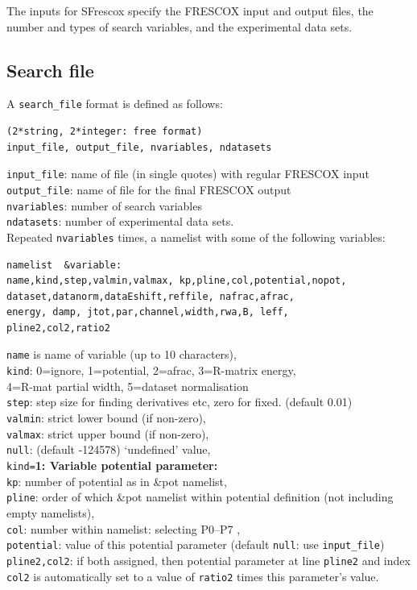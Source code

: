 \documentclass[11pt]{article}
\begin{document}
The inputs for {\sc SFrescox} specify the FRESCOX input and output files,
the number and types of search variables, and the experimental data sets.

\subsection{Search file}
A {\tt search\_file} format is defined as follows:
\begin{verbatim}
(2*string, 2*integer: free format)
input_file, output_file, nvariables, ndatasets
\end{verbatim}
\smallskip

{\tt input\_file}: name of file (in single quotes) with regular FRESCOX input\\
{\tt output\_file}: name of file for the final FRESCOX output\\
{\tt nvariables}: number of search variables\\
{\tt ndatasets}:  number of experimental data sets.\\

Repeated {\tt nvariables} times, a namelist with some of the following variables:
\begin{verbatim}
namelist  &variable:
name,kind,step,valmin,valmax, kp,pline,col,potential,nopot,
dataset,datanorm,dataEshift,reffile, nafrac,afrac,
energy, damp, jtot,par,channel,width,rwa,B, leff,
pline2,col2,ratio2
\end{verbatim}
{\tt name} is name of variable (up to 10 characters),\\
{\tt kind}: 0=ignore, 1=potential, 2=afrac, 3=R-matrix energy,\\
   \hspace*{10mm} 4=R-mat partial width, 5=dataset normalisation\\
{\tt step}: step size for finding derivatives etc, zero for fixed. (default 0.01)\\
{\tt valmin}: strict lower bound (if non-zero),\\
{\tt valmax}: strict upper bound (if non-zero), \\
{\tt null}: (default -124578) `undefined' value,\\

{\tt kind=}{\bf 1: Variable potential parameter:}\\
{\tt kp}: number of potential as in \&pot namelist,\\
{\tt pline}: order of which \&pot namelist within potential definition (not including empty namelists), \\
{\tt col}:   number within namelist: selecting P0--P7 ,\\
{\tt potential}: value of this potential parameter (default {\tt null}: use {\tt input\_file})\\
{\tt pline2,col2}: if both assigned, then potential parameter at line {\tt pline2} and index {\tt col2} is automatically set to 
a value of {\tt ratio2} times this parameter's value. \\
\end{document}
